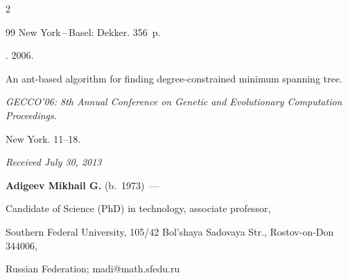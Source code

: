 \begin{multicols}{2}
{{\begin{thebibliography}{99}
New York\,--\,Basel: Dekker. 356~p.







. 2006.


An ant-based algorithm for finding degree-constrained minimum spanning tree.


\textit{GECCO'06: 8th Annual Conference on Genetic and Evolutionary Computation Proceedings.}


New York. 11--18.


{





}





\end{thebibliography}


} }








\end{multicols}





\vspace*{-6pt}





\hfill{\small\textit{Received July 30, 2013}}





\vspace*{-18pt}





\Contrl





\noindent


\textbf{Adigeev Mikhail G.} (b.\ 1973)~---


Candidate of Science (PhD) in technology, associate professor,


Southern Federal University, 105/42 Bol'shaya Sadovaya Str., Rostov-on-Don 344006,


Russian Federation; madi@math.sfedu.ru





 \label{end\stat}





\renewcommand{\bibname}{\protect\rm Литература}